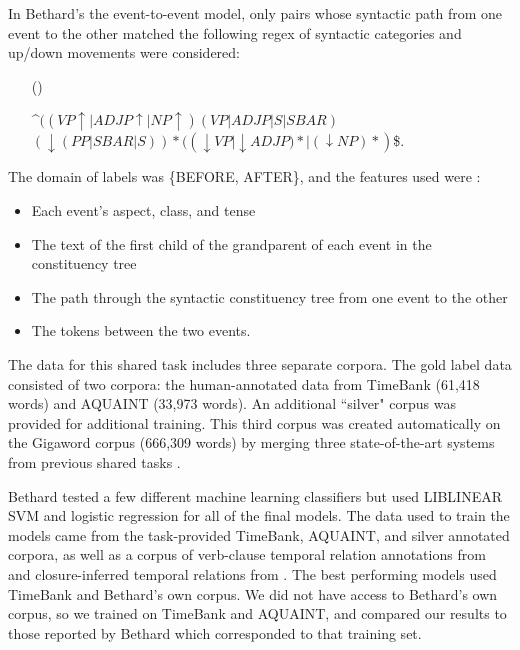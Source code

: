 \documentclass[11pt]{article}
\begin{document}
In Bethard's the event-to-event model, only pairs whose syntactic path from one event to the other matched the following regex of syntactic categories and up/down movements were considered:

\begin{itemize}

\item[(\exampleno)] \label{syntax_regex}

\^{}$((VP\uparrow|ADJP\uparrow|NP\uparrow)(VP|ADJP|S|SBAR)$\\ $(\downarrow(PP|SBAR|S))*(({\downarrow}VP|{\downarrow}ADJP)*|({\downarrow}NP)*)$\$.
\end{itemize}


The domain of labels was \{BEFORE, AFTER\}, and the features used were \cite{Bethard:13}:

\begin{itemize}
\item Each event's aspect, class, and tense
\item The text of the first child of the grandparent of each event in the constituency tree
\item The path through the syntactic constituency tree from one event to the other
\item The tokens between the two events.
\end{itemize}

%
The data for this shared task includes three separate corpora. The gold label data consisted of two corpora: the human-annotated data from TimeBank (61,418 words) and AQUAINT (33,973 words). An additional ``silver" corpus was provided for additional training. This third corpus was created automatically on the Gigaword corpus (666,309 words) by merging three state-of-the-art systems from previous shared tasks \cite{UzZaman:13}.

Bethard tested a few different machine learning classifiers but used LIBLINEAR SVM and logistic regression for all of the final models. The data used to train the models came from the task-provided TimeBank, AQUAINT, and silver annotated corpora, as well as a corpus of verb-clause temporal relation annotations from  and closure-inferred temporal relations from . The best performing models used TimeBank and Bethard's own corpus. We did not have access to Bethard's own corpus, so we trained on TimeBank and AQUAINT, and compared our results to those reported by Bethard which corresponded to that training set.
\end{document}
